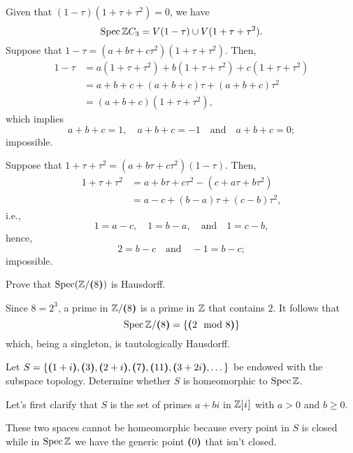 \begin{solution}
    Given that $(1-\tau)(1+\tau+\tau^2)=0$, we have
    $$
        \operatorname{Spec}\mathbb{Z} C_3 = V(1-\tau)\cup V(1+\tau+\tau^2).
    $$
    Suppose that $1-\tau=(a+b\tau+c\tau^2)(1+\tau+\tau^2)$. Then,
    \begin{align*}
        1-\tau &= a(1+\tau+\tau^2) + b(1+\tau+\tau^2)
                + c(1+\tau+\tau^2)\\
            &= a+b+c + (a+b+c)\tau + (a+b+c)\tau^2\\
            &= (a+b+c)(1+\tau+\tau^2),
    \end{align*}
    which implies
    $$
        a+b+c = 1,\quad a+b+c=-1\quad\text{and}\quad a+b+c=0;
    $$
    impossible.

    Suppose that $1+\tau+\tau^2=(a+b\tau+c\tau^2)(1-\tau)$. Then,
    \begin{align*}
        1+\tau+\tau^2 &= a+b\tau+c\tau^2-(c+a\tau+b\tau^2)\\
            &= a-c + (b-a)\tau + (c-b)\tau^2,
    \end{align*}
    i.e.,
    $$
        1 = a-c,\quad1=b-a,\quad\text{and}\quad 1=c-b,
    $$
    hence,
    $$
        2 = b-c\quad\text{and}\quad -1=b-c;
    $$
    impossible.
\end{solution}


\begin{exr}
    Prove that\/ $\operatorname{Spec}(\mathbb{Z}/\textrm{\boldmath$($}8\textrm{\boldmath$)$})$ is Hausdorff.
\end{exr}

\begin{solution}
    Since $8=2^3$, a prime in $\mathbb{Z}/\textrm{\boldmath$($}8\textrm{\boldmath$)$}$ is a prime in $\mathbb{Z}$ that contains $2$. It follows that
    $$
    \operatorname{Spec}\mathbb{Z}/\textrm{\boldmath$($}8\textrm{\boldmath$)$}=\{\textrm{\boldmath$($}2\mod8\textrm{\boldmath$)$}\}
    $$
    which, being a singleton, is tautologically Hausdorff.
\end{solution}

\begin{exr}
    Let\/ $S=\{\textrm{\boldmath$($}1+i\textrm{\boldmath$)$},\textrm{\boldmath$($}3\textrm{\boldmath$)$},\textrm{\boldmath$($}2+i\textrm{\boldmath$)$},\textrm{\boldmath$($}7\textrm{\boldmath$)$},\textrm{\boldmath$($}11\textrm{\boldmath$)$},\textrm{\boldmath$($}3+2i\textrm{\boldmath$)$},\dots\}$ be endowed with the subspace topology. Determine whether\/ $S$ is homeomorphic to\/ $\operatorname{Spec}\mathbb{Z}$.
\end{exr}

\begin{solution}
    Let's first clarify that $S$ is the set of primes $a+bi$ in $\mathbb{Z}[{\mkern1mu i\mkern1mu}]$ with $a>0$ and $b\ge0$.

    These two spaces cannot be homeomorphic because every point in $S$ is closed while in $\operatorname{Spec}\mathbb{Z}$ we have the generic point $\textrm{\boldmath$($}0\textrm{\boldmath$)$}$ that isn't closed.
\end{solution}

